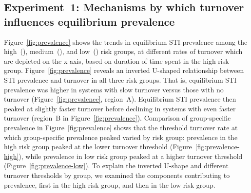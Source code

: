 \subsection{Experiment~1: Mechanisms by which turnover influences equilibrium prevalence}
\label{ss:res-prevalence}
Figure~\ref{fig:prevalence} shows the trends in equilibrium STI prevalence among the
high~(),
medium~(), and
low~()
risk groups, at different rates of turnover
which are depicted on the x-axis,
based on duration of time spent in the high risk group.
Figure~\ref{fig:prevalence} reveals an inverted U-shaped relationship
between STI prevalence and turnover in all three risk groups.
That is, equilibrium STI prevalence was higher in systems with slow turnover
versus those with no turnover
(Figure~\ref{fig:prevalence}, region~A).
Equilibrium STI prevalence then peaked at slightly faster turnover
before declining in systems with even faster turnover
(region~B in Figure~\ref{fig:prevalence}).
Comparison of group-specific prevalence in Figure~\ref{fig:prevalence} shows that
the threshold turnover rate at which group-specific prevalence peaked varied by risk group:
prevalence in the high risk group peaked at the lower turnover threshold
(Figure~\ref{fig:prevalence-high}),
while prevalence in low risk group peaked at a higher turnover threshold
(Figure~\ref{fig:prevalence-low}).
To explain the inverted U-shape and different turnover thresholds by group,
we examined the components contributing to prevalence,
first in the high risk group, and then in the low risk group.
